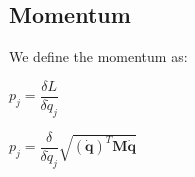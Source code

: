 
\subsection{Momentum}

We define the momentum as:

\(p_j = \dfrac{\delta L}{\delta \dot q_j}\)

\(p_j = \dfrac{\delta }{\delta \dot q_j}\sqrt {(\mathbf {\dot q})^T\mathbf M\mathbf {\dot q}}\)


